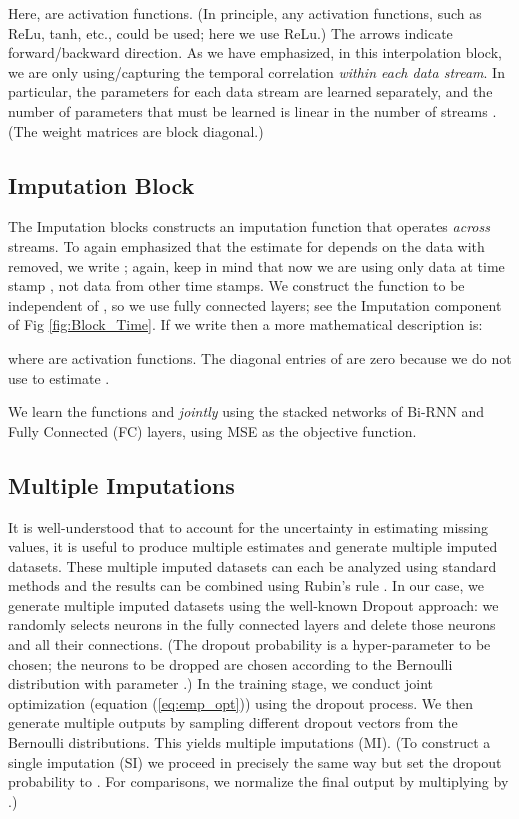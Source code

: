 \documentclass{article}
\begin{document}
	Here,  are  activation functions.  (In principle, any  activation functions, such as ReLu, tanh, etc., could be used; here we use ReLu.)  The arrows indicate forward/backward direction.  As we have emphasized, in this  interpolation block, we are only using/capturing the temporal correlation {\em within each data stream}. In particular, the parameters for each data stream are learned separately, and the number of parameters that must be learned is linear in the number of streams . (The weight matrices  are block diagonal.) 
	
	\subsection{Imputation Block } The  Imputation blocks constructs an imputation function  that operates {\em across} streams. To again emphasized that the estimate  for   depends on the data with  removed, we write ; again, keep in mind that now we are using only data at time stamp , not data from other time stamps. We construct the function  to be independent of , so we use fully connected layers; see the Imputation component of Fig \ref{fig:Block_Time}. If we write  then a more mathematical description is:	
	
	where  are  activation functions.  The diagonal entries of   are zero because we do not use  to estimate .   
		
	We learn the functions  and  {\em jointly} using the stacked networks of Bi-RNN and Fully Connected (FC) layers, using MSE as the objective function.
	
	
	
	
	\subsection{Multiple Imputations} \label{sect:MI} 
	It is well-understood that to account for the uncertainty in estimating missing values, it is useful to produce multiple estimates and generate multiple imputed datasets. These multiple imputed datasets can each be analyzed using standard methods and the results can be combined using Rubin’s rule \cite{Rubin}. In our case, we generate multiple imputed datasets using the well-known Dropout \cite{Dropout} approach: we randomly selects neurons in the fully connected layers and delete those neurons and all their connections. (The dropout probability  is a hyper-parameter to be chosen; the neurons to be dropped are chosen according to the Bernoulli distribution with parameter .) In the training stage, we conduct joint optimization (equation (\ref{eq:emp_opt})) using the dropout process. We then generate multiple outputs  by sampling different dropout vectors  from the Bernoulli distributions. This yields multiple imputations (MI). (To construct a single imputation (SI) we proceed in precisely the same way but set the dropout probability to .  For comparisons, we normalize the final output by multiplying by .)
	
\end{document}
